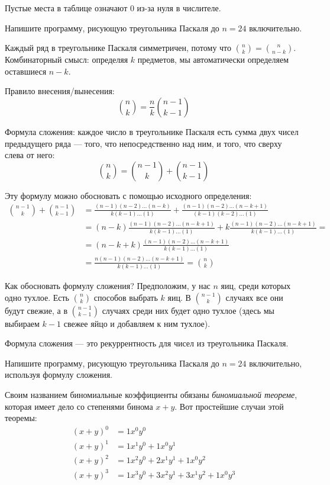 \documentclass[14pt,openany]{book}
\begin{document}
Пустые места в таблице означают $0$ из-за нуля в числителе.

\begin{task}
Напишите программу, рисующую треугольника Паскаля до $n=24$ включительно.
\end{task}

Каждый ряд в треугольнике Паскаля симметричен, потому что $\binom{n}{k}=\binom{n}{n-k}$.
Комбинаторный смысл: определяя $k$ предметов, мы автоматически определяем оставшиеся $n-k$.

Правило внесения/вынесения:
$$\binom{n}{k} = \frac{n}{k}\binom{n-1}{k-1}$$

Формула сложения: каждое число в треугольнике Паскаля есть сумма двух чисел предыдущего ряда ---
того, что непосредственно над ним, и того, что сверху слева от него:
\begin{equation}
\label{formula-binom-rec}
\binom{n}{k} = \binom{n-1}{k} + \binom{n-1}{k-1}
\end{equation}

Эту формулу можно обосновать с помощью исходного определения:
\begin{align*}
  \binom{n-1}{k} + \binom{n-1}{k-1} 
  &= \frac{(n-1)(n-2)\ldots(n-k)}{k(k-1)\ldots(1)} 
     + \frac{(n-1)(n-2)\ldots(n-k+1)}{(k-1)(k-2)\ldots(1)}  \\
  &= (n-k)\frac{(n-1)(n-2)\ldots(n-k+1)}{k(k-1)\ldots(1)} 
     + k\frac{(n-1)(n-2)\ldots(n-k+1)}{k(k-1)\ldots(1)} = \\
  &= (n-k+k)\frac{(n-1)(n-2)\ldots(n-k+1)}{k(k-1)\ldots(1)} \\
  &= \frac{n(n-1)(n-2)\ldots(n-k+1)}{k(k-1)\ldots(1)} = \binom{n}{k}
\end{align*}

Как обосновать формулу сложения? Предположим, у нас $n$ яиц, среди которых
одно тухлое. Есть $\binom{n}{k}$ способов выбрать $k$ яиц. В $\binom{n-1}{k}$
случаях все они будут свежие, а в $\binom{n-1}{k-1}$ случаях среди них будет
одно тухлое (здесь мы выбираем $k-1$ свежее яйцо и добавляем к ним тухлое).

Формула сложения --- это рекуррентность для чисел из треугольника Паскаля.

\begin{task}
Напишите программу, рисующую треугольника Паскаля до $n=24$ включительно,
используя формулу сложения.
\end{task}

Своим названием биномиальные коэффициенты обязаны \emph{биномиальной теореме}, которая
имеет дело со степенями бинома $x+y$. Вот простейшие случаи этой теоремы:
\begin{align*}
(x+y)^0 &= 1x^0y^0 \\
(x+y)^1 &= 1x^1y^0 + 1x^0y^1 \\
(x+y)^2 &= 1x^2y^0 + 2x^1y^1 + 1x^0y^2 \\
(x+y)^3 &= 1x^3y^0 + 3x^2y^1 + 3x^1y^2 + 1x^0y^3
\end{align*}
\end{document}
